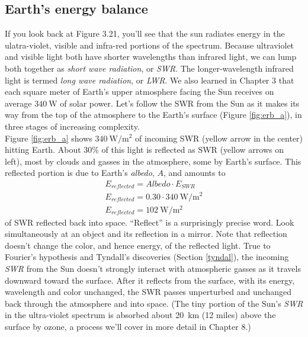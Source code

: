 \documentclass[amstex,12pt]{book}
\begin{document}
\subsection{Earth's energy balance}\label{ghe_1}
If you look back at Figure 3.21, you'll see that the sun radiates energy in the ulatra-violet, visible and infra-red portions of the spectrum. Because ultraviolet and visible light both have shorter wavelengths than infrared light, we can lump both together as \textit{short wave radiation}, or \textit{SWR}. The longer-wavelength infrared light is termed \textit{long wave radiation}, or \textit{LWR}. We also learned in Chapter 3 that each square meter of Earth's upper atmosphere facing the Sun receives on average $\SI{340}{\watt}$ of solar power.  Let's follow the SWR from the Sun as it makes its way from the top of the atmosphere to the Earth's surface (Figure \ref{fig:erb_a}), in three stages of increasing complexity.\\ 
Figure \ref{fig:erb_a} shows $\SI{340}{\watt\per\m^{2}}$ of incoming SWR (yellow arrow in the center) hitting Earth. About 30\% of this light is reflected as SWR (yellow arrows on left), most by clouds and gasses in the atmosphere, some by Earth's surface. This reflected portion is due to Earth's \emph{albedo}, $A$, and amounts to
\begin{align}
	E_{reflected}=Albedo\cdot E_{SWR}\\
	E_{reflected}=0.30\cdot \SI{340}{\watt\per\m^{2}}\\ \label{eq:eref}
	E_{reflected}=\SI{102}{\watt\per\m^{2}}
\end{align}
of SWR reflected back into space. ``Reflect'' is a surprisingly precise word. Look simultaneously at an object and its reflection in a mirror. Note that reflection doesn't change the color, and hence energy, of the reflected light. True to Fourier's hypothesis and Tyndall's discoveries (Section \ref{tyndal}), the incoming \textit{SWR} from the Sun doesn't strongly interact with atmospheric gasses as it travels downward toward the surface. After it reflects from the surface, with its energy, wavelength and color unchanged, the SWR passes unperturbed and unchanged back through the atmosphere and into space. (The tiny portion of the Sun's \textit{SWR} in the ultra-violet spectrum is absorbed about \SI{20}{\kilo\metre} (12 miles) above the surface by ozone, a process we'll cover in more detail in Chapter 8.)\\
 
\end{document}
